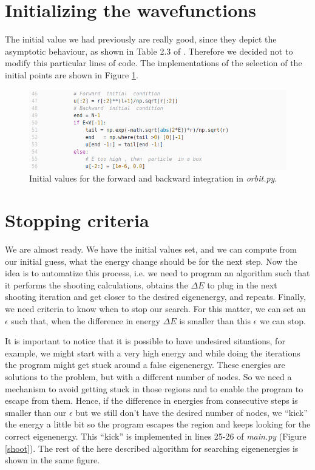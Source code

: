 \documentclass[12pt]{article}
\begin{document}
\section{Initializing the wavefunctions}

The initial value we had previously are really good, since they depict the asymptotic behaviour, as shown in Table 2.3 of \cite{zhangQ}. Therefore we decided not to modify this particular lines of code. The implementations of the selection of the initial points are shown in Figure \ref{init}.

\begin{figure}[h!]
    \centering
    \includegraphics[width=\linewidth]{init}
    \caption{Initial values for the forward and backward integration in \textit{orbit.py}.}
    \label{init}
\end{figure}

\clearpage
\section{Stopping criteria}

We are almost ready. We have the initial values set, and we can compute from our initial guess, what the energy change should be for the next step. Now the idea is to automatize this process, i.e. we need to program an algorithm such that it performs the shooting calculations, obtains the $\Delta E$ to plug in the next shooting iteration and get closer to the desired eigenenergy, and repeats. Finally, we need criteria to know when to stop our search. For this matter, we can set an $\epsilon$ such that, when the difference in energy $\Delta E$ is smaller than this $\epsilon$ we can stop. 

It is important to notice that it is possible to have undesired situations, for example, we might start with a very high energy and while doing the iterations the program might get stuck around a false eigenenergy. These energies are solutions to the problem, but with a different number of nodes. So we need a mechanism to avoid getting stuck in those regions and to enable the program to escape from them. Hence, if the difference in energies from consecutive steps is smaller than our $\epsilon$ but we still don't have the desired number of nodes, we ``kick'' the energy a little bit so the program escapes the region and keeps looking for the correct eigenenergy. This ``kick'' is implemented in lines 25-26 of \textit{main.py} (Figure \ref{shoot}). The rest of the here described algorithm for searching eigenenergies is shown in the same figure.
\end{document}
